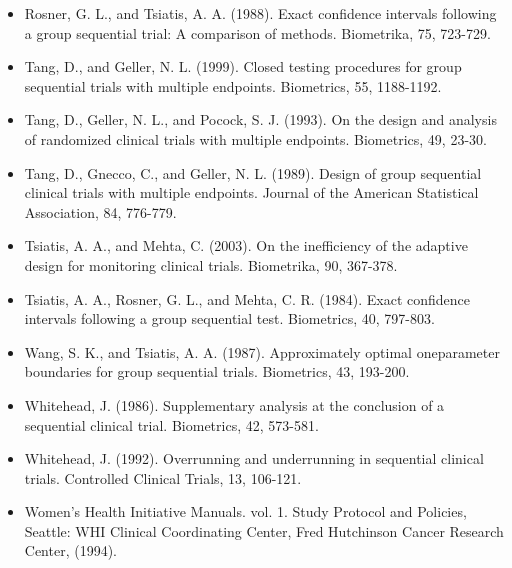 \documentclass[10pt]{article}
\begin{document}
\begin{itemize}
  \item[41.] Rosner, G. L., and Tsiatis, A. A. (1988). Exact confidence intervals following a group sequential trial: A comparison of methods. Biometrika, 75, 723-729.
  \item[42.] Tang, D., and Geller, N. L. (1999). Closed testing procedures for group sequential trials with multiple endpoints. Biometrics, 55, 1188-1192.
  \item[43.] Tang, D., Geller, N. L., and Pocock, S. J. (1993). On the design and analysis of randomized clinical trials with multiple endpoints. Biometrics, 49, 23-30.
  \item[44.] Tang, D., Gnecco, C., and Geller, N. L. (1989). Design of group sequential clinical trials with multiple endpoints. Journal of the American Statistical Association, 84, 776-779.
  \item[45.] Tsiatis, A. A., and Mehta, C. (2003). On the inefficiency of the adaptive design for monitoring clinical trials. Biometrika, 90, 367-378.
  \item[46.] Tsiatis, A. A., Rosner, G. L., and Mehta, C. R. (1984). Exact confidence intervals following a group sequential test. Biometrics, 40, 797-803.
  \item[47.] Wang, S. K., and Tsiatis, A. A. (1987). Approximately optimal oneparameter boundaries for group sequential trials. Biometrics, 43, 193-200.
  \item[48.] Whitehead, J. (1986). Supplementary analysis at the conclusion of a sequential clinical trial. Biometrics, 42, 573-581.
  \item[49.] Whitehead, J. (1992). Overrunning and underrunning in sequential clinical trials. Controlled Clinical Trials, 13, 106-121.
  \item[50.] Women's Health Initiative Manuals. vol. 1. Study Protocol and Policies, Seattle: WHI Clinical Coordinating Center, Fred Hutchinson Cancer Research Center, (1994).
\end{itemize}
\end{document}
